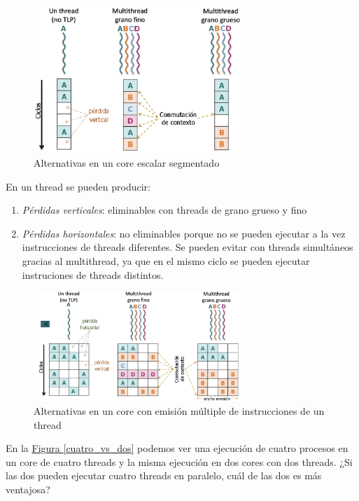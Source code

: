 \documentclass[10pt,a4paper,spanish]{report}
\begin{document}
\begin{figure}[!h]
\centering
\includegraphics[width=0.7\textwidth]{65}
\caption{Alternativas en un core escalar segmentado}
\label{alt_multit}
\end{figure}

En un thread se pueden producir:
\begin{enumerate}[\color{azul}{\bf $\heartsuit$}]
    \item \textcolor[rgb]{0.2,0.4,0.8}{\textit{Pérdidas verticales}}: eliminables con threads de grano grueso y fino
    \item \textcolor[rgb]{0.2,0.4,0.8}{\textit{Pérdidas horizontales}}: no eliminables porque no se pueden ejecutar a la vez instrucciones de threads diferentes. Se pueden evitar con threads simultáneos gracias al multithread, ya que en el mismo ciclo se pueden ejecutar instruciones de threads distintos.
\end{enumerate}

\begin{figure}[!h]
\centering
\includegraphics[width=0.7\textwidth]{64}
\caption{Alternativas en un core con emisión múltiple de instrucciones de un thread}
\label{alt_multit}
\end{figure}

En la \hyperref[cuatro_vs_dos]{Figura \ref*{cuatro_vs_dos}} podemos ver una ejecución de cuatro procesos en un core de cuatro threads y la misma ejecución en dos cores con dos threads. ¿Si las dos pueden ejecutar cuatro threads en paralelo, cuál de las dos es más ventajosa?
\end{document}
